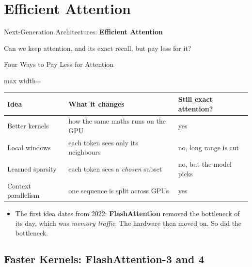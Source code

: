 \section{Efficient Attention}

\begin{frame}{}
    \LARGE Next-Generation Architectures: \textbf{Efficient Attention}

    \vspace{1em}
    \normalsize Can we keep attention, and its exact recall, but pay less for it?
\end{frame}

\begin{frame}{Four Ways to Pay Less for Attention}
    \begin{center}
    \small
    \renewcommand{\arraystretch}{1.3}
    \begin{adjustbox}{max width=\linewidth}\begin{tabular}{>{\raggedright\arraybackslash}p{3.6cm}>{\raggedright\arraybackslash}p{5.0cm}>{\raggedright\arraybackslash}p{4.4cm}}
        \toprule
        \textbf{Idea} & \textbf{What it changes} & \textbf{Still exact attention?} \\
        \midrule
        Better kernels & how the same maths runs on the GPU & yes \\
        Local windows & each token sees only its neighbours & no, long range is cut \\
        Learned sparsity & each token sees a \emph{chosen} subset & no, but the model picks \\
        Context parallelism & one sequence is split across GPUs & yes \\
        \bottomrule
    \end{tabular}\end{adjustbox}
    \end{center}
    \vspace{0.3em}
    \begin{itemize}\itemsep0.5em
        \item The first idea dates from 2022: \textbf{FlashAttention} removed the bottleneck of its day, which was \emph{memory traffic}. The hardware then moved on. So did the bottleneck.
    \end{itemize}
\end{frame}

\subsection{Faster Kernels: FlashAttention-3 and 4}

